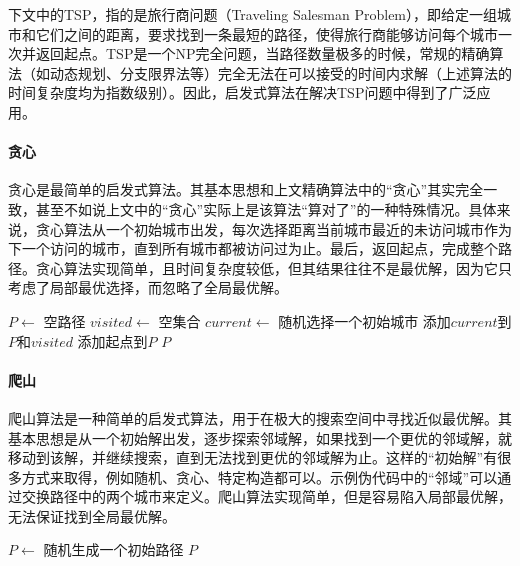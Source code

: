 下文中的TSP，指的是旅行商问题（Traveling Salesman Problem），即给定一组城市和它们之间的距离，要求找到一条最短的路径，使得旅行商能够访问每个城市一次并返回起点。TSP是一个NP完全问题，当路径数量极多的时候，常规的精确算法（如动态规划、分支限界法等）完全无法在可以接受的时间内求解（上述算法的时间复杂度均为指数级别）。因此，启发式算法在解决TSP问题中得到了广泛应用。

\paragraph{贪心} 贪心是最简单的启发式算法。其基本思想和上文精确算法中的“贪心”其实完全一致，甚至不如说上文中的“贪心”实际上是该算法“算对了”的一种特殊情况。具体来说，贪心算法从一个初始城市出发，每次选择距离当前城市最近的未访问城市作为下一个访问的城市，直到所有城市都被访问过为止。最后，返回起点，完成整个路径。贪心算法实现简单，且时间复杂度较低，但其结果往往不是最优解，因为它只考虑了局部最优选择，而忽略了全局最优解。

\begin{algorithm}[htbp]
    \caption{贪心算法解决TSP问题的伪代码}\label{alg:greedy-tsp}
    $P \leftarrow$ 空路径\;
    $visited \leftarrow$ 空集合\;
    $current \leftarrow$ 随机选择一个初始城市\;
    添加$current$到$P$和$visited$\;
    添加起点到$P$\;
    \Return $P$\;
\end{algorithm}

\paragraph{爬山} 爬山算法是一种简单的启发式算法，用于在极大的搜索空间中寻找近似最优解。其基本思想是从一个初始解出发，逐步探索邻域解，如果找到一个更优的邻域解，就移动到该解，并继续搜索，直到无法找到更优的邻域解为止。这样的“初始解”有很多方式来取得，例如随机、贪心、特定构造都可以。示例伪代码中的“邻域”可以通过交换路径中的两个城市来定义。爬山算法实现简单，但是容易陷入局部最优解，无法保证找到全局最优解。
\begin{algorithm}[htbp]
    \caption{爬山算法解决TSP问题的伪代码}\label{alg:hill-climbing}
    $P \leftarrow$ 随机生成一个初始路径\;
    \Return $P$\;
\end{algorithm}

